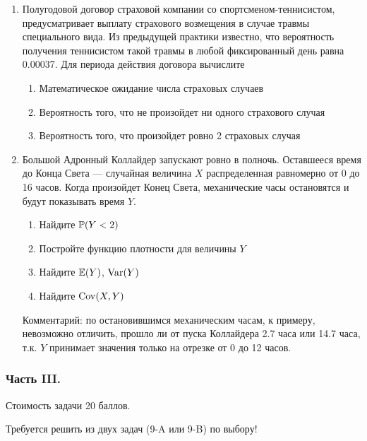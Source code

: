 \begin{enumerate}
\item Полугодовой договор страховой компании со спортсменом-теннисистом, предусматривает выплату страхового возмещения  в случае травмы специального вида. Из предыдущей практики известно, что вероятность получения теннисистом такой травмы  в любой фиксированный день равна 0.00037. Для периода действия договора вычислите
\begin{enumerate}
\item Математическое ожидание числа страховых случаев
\item Вероятность того, что не произойдет ни одного страхового случая
\item Вероятность того, что произойдет ровно 2 страховых случая
\end{enumerate}

\item Большой Адронный Коллайдер запускают ровно в полночь. Оставшееся время до Конца Света — случайная величина $X$ распределенная равномерно от 0 до 16 часов. Когда произойдет Конец Света, механические часы остановятся и будут показывать время $Y$.
\begin{enumerate}
\item Найдите $\P(Y<2)$
\item Постройте функцию плотности для величины $Y$
\item Найдите $\E(Y)$, $\Var(Y)$
\item Найдите $\Cov(X,Y)$
\end{enumerate}
Комментарий: по остановившимся механическим часам, к примеру, невозможно отличить, прошло ли от пуска Коллайдера 2.7 часа или 14.7 часа, т.к. $Y$ принимает значения только на отрезке от 0 до 12 часов.
\end{enumerate}

\subsubsection*{Часть III.}

Стоимость задачи 20 баллов.

Требуется решить \textbf{} из двух задач (9-A или 9-B) по
выбору!

